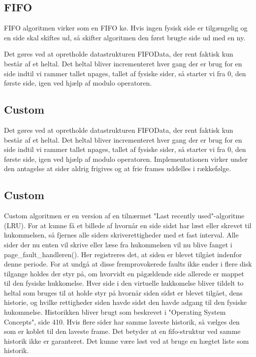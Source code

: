 \subsection{FIFO}
FIFO algoritmen virker som en FIFO kø. Hvis ingen fysisk side er tilgængelig og en side skal skiftes ud, så skifter algoritmen den først brugte side ud med en ny.

Det gøres ved at opretholde datastrukturen FIFOData, der rent faktisk kun består af et heltal. Det heltal bliver incrementeret hver gang der er brug for en side indtil vi rammer tallet npages, tallet af fysiske sider, så starter vi fra 0, den første side, igen ved hjælp af modulo operatoren.

\subsection{Custom}
Det gøres ved at opretholde datastrukturen FIFOData, der rent faktisk kun består af et heltal. Det heltal bliver incrementeret hver gang der er brug for en side indtil vi rammer tallet npages, tallet af fysiske sider, så starter vi fra 0, den første side, igen ved hjælp af modulo operatoren. Implementationen virker under den antagelse at sider aldrig frigives og at frie frames uddelles i rækkefølge.

\subsection{Custom}
Custom algoritmen er en version af en tilnærmet "Last recently used"-algoritme (LRU). For at kunne få et billede af hvornår en side sidst har læst eller skrevet til hukommelsen, så fjernes alle siders skriverettigheder med et fast interval. Alle sider der nu enten vil skrive eller læse fra hukommelsen vil nu blive fanget i page\_fault\_handleren(). Her registreres det, at siden er blevet tilgået indenfor denne periode. For at undgå at disse fremprovokerede faults ikke ender i flere disk tilgange holdes der styr på, om hvorvidt en pågældende side allerede er mappet til den fysiske hukkomelse.
Hver side i den virtuelle hukkomelse bliver tildelt to heltal som bruges til at holde styr på hvornår siden sidst er blevet tilgået, dens historie, og hvilke rettigheder siden havde sidst den havde adgang til den fysiske hukommelse. Historikken bliver brugt som beskrevet i "Operating System Concepts", side 410. Hvis flere sider har samme laveste historik, så vælges den som er koblet til den laveste frame. Det betyder at en fifo-struktur ved samme historik ikke er garanteret. Det kunne være løst ved at bruge en hægtet liste som historik.